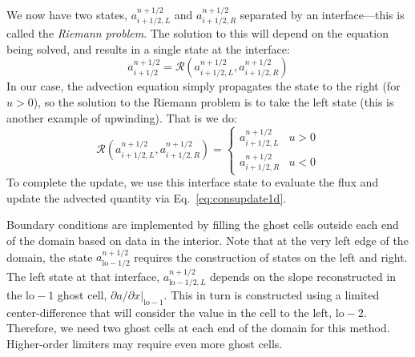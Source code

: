 \documentclass[11pt]{article}
\begin{document}
We now have two states, $a_{i+1/2,L}^{n+1/2}$ and
$a_{i+1/2,R}^{n+1/2}$ separated by an interface---this is called the
{\em Riemann problem}.
%
The solution to this will depend on the equation being solved, and
results in a single state at the interface:
\begin{equation}
a_{i+1/2}^{n+1/2} = \mathcal{R}(a_{i+1/2,L}^{n+1/2},a_{i+1/2,R}^{n+1/2})
\end{equation}
In our case, the advection equation simply propagates the state to the
right (for $u > 0$), so the solution to the Riemann problem is to take
the left state (this is another example of upwinding).  That is we do:
\begin{equation}
\mathcal{R}(a_{i+1/2,L}^{n+1/2},a_{i+1/2,R}^{n+1/2}) = \left \{ \begin{array}{ccc} a_{i+1/2,L}^{n+1/2} & u > 0 \\[2mm] a_{i+1/2,R}^{n+1/2} & u < 0 \end{array} \right .
\label{eq:riemannsolve}
\end{equation}
To complete the update, we use this interface state to evaluate the flux
and update the advected quantity via Eq.~\ref{eq:consupdate1d}.

Boundary conditions are implemented by filling the ghost cells outside
each end of the domain based on data in the interior.  Note that at
the very left edge of the domain, the state
$a^{n+1/2}_{\mathrm{lo}-1/2}$ requires the construction of states on
the left and right.  The left state at that interface,
$a^{n+1/2}_{\mathrm{lo}-1/2,L}$ depends on the slope reconstructed in
the $\mathrm{lo}-1$ ghost cell, $\partial a/\partial x
|_{\mathrm{lo}-1}$.  This in turn is constructed using a limited
center-difference that will consider the value in the cell to the
left, $\mathrm{lo-2}$.  Therefore, we need two ghost cells at each end
of the domain for this method.  Higher-order limiters may require even
more ghost cells.
\end{document}
